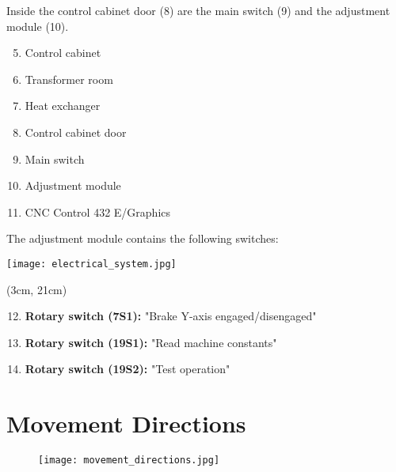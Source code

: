 \vspace{0.3cm}
\noindent Inside the control cabinet door (8) are the main switch (9) and the adjustment module (10).

\begin{minipage}[c]{0.45\textwidth}
    \begin{enumerate}[itemsep=1pt,parsep=0pt]
        \setcounter{enumi}{4}
        \item Control cabinet
        \item Transformer room
        \item Heat exchanger
        \item Control cabinet door
        \item Main switch
        \item Adjustment module
        \item CNC Control 432 E/Graphics
    \end{enumerate}

    \noindent The adjustment module contains the following switches:
\end{minipage}%
\begin{minipage}{0.6\textwidth}
    \centering
    \texttt{[image: electrical\_system.jpg]}
    \label{fig:electrical_system}
\end{minipage}

\begin{textblock*}{\textwidth}(3cm, 21cm)  %
    \begin{enumerate}[itemsep=1pt,parsep=0pt]
        \setcounter{enumi}{11}
        \item \textbf{Rotary switch (7S1):} "Brake Y-axis engaged/disengaged"
        \item \textbf{Rotary switch (19S1):} "Read machine constants"
        \item \textbf{Rotary switch (19S2):} "Test operation"
    \end{enumerate}
\end{textblock*}

\vspace{2cm}


\section{Movement Directions}

\begin{figure}[h]
    \centering
    \texttt{[image: movement\_directions.jpg]}
\end{figure}

